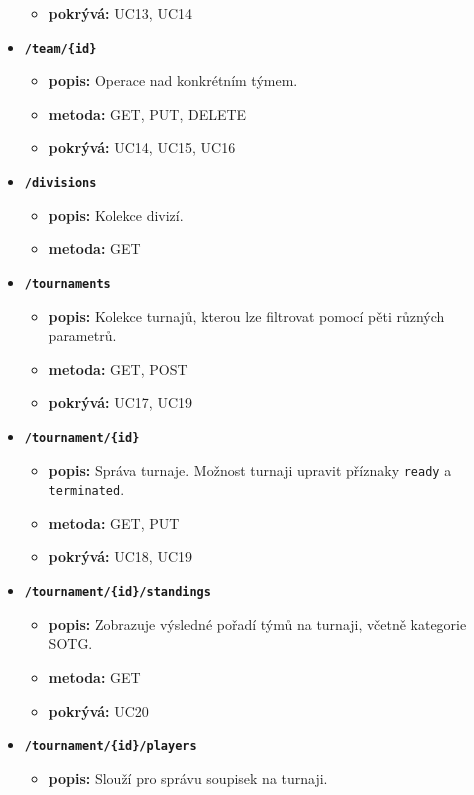 \begin{itemize}
\begin{itemize}
    \item \textbf{pokrývá:} UC13, UC14
  \end{itemize}
  \item \texttt{\textbf{/team/\{id\}}}
  \begin{itemize}
    \item \textbf{popis:} Operace nad konkrétním týmem.
    \item \textbf{metoda:} GET, PUT, DELETE
    \item \textbf{pokrývá:} UC14, UC15, UC16
  \end{itemize}
  \item \texttt{\textbf{/divisions}}
  \begin{itemize}
    \item \textbf{popis:} Kolekce divizí.
    \item \textbf{metoda:} GET
  \end{itemize}
  \item \texttt{\textbf{/tournaments}}
  \begin{itemize}
    \item \textbf{popis:} Kolekce turnajů, kterou lze filtrovat pomocí pěti různých parametrů.
    \item \textbf{metoda:} GET, POST
    \item \textbf{pokrývá:} UC17, UC19
  \end{itemize}
  \item \texttt{\textbf{/tournament/\{id\}}}
  \begin{itemize}
    \item \textbf{popis:} Správa turnaje. Možnost turnaji upravit příznaky \texttt{ready} a \texttt{terminated}.
    \item \textbf{metoda:} GET, PUT
    \item \textbf{pokrývá:} UC18, UC19
  \end{itemize}
  \item \texttt{\textbf{/tournament/\{id\}/standings}}
  \begin{itemize}
    \item \textbf{popis:} Zobrazuje výsledné pořadí týmů na turnaji, včetně kategorie SOTG.
    \item \textbf{metoda:} GET
    \item \textbf{pokrývá:} UC20
  \end{itemize}
  \item \texttt{\textbf{/tournament/\{id\}/players}}
  \begin{itemize}
    \item \textbf{popis:} Slouží pro správu soupisek na turnaji.

\end{itemize}
\end{itemize}
